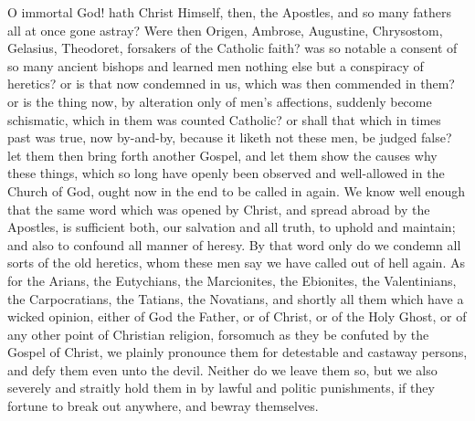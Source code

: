 O immortal God! hath Christ Himself, then, the Apostles, and so many
fathers all at once gone astray? Were then Origen, Ambrose, Augustine,
Chrysostom, Gelasius, Theodoret, forsakers of the Catholic faith? was
so notable a consent of so many ancient bishops and learned men nothing
else but a conspiracy of heretics? or is that now condemned in us, which
was then commended in them? or is the thing now, by alteration only
of men’s affections, suddenly become schismatic, which in them
was counted Catholic? or shall that which in times past was true, now
by-and-by, because it liketh not these men, be judged false? let them
then bring forth another Gospel, and let them show the causes why these
things, which so long have openly been observed and well-allowed in
the Church of God, ought now in the end to be called in again.
We know well enough that the same word which was opened by Christ, and
spread abroad by the Apostles, is sufficient both, our salvation and
all truth, to uphold and maintain; and also to confound all manner of
heresy. By that word only do we condemn all sorts of the old heretics,
whom these men say we have called out of hell again. As for the
Arians, the Eutychians, the Marcionites, the Ebionites, the Valentinians,
the Carpocratians, the Tatians, the Novatians, and shortly all them
which have a wicked opinion, either of God the Father, or of Christ,
or of the Holy Ghost, or of any other point of Christian religion, forsomuch
as they be confuted by the Gospel of Christ, we plainly pronounce them
for detestable and castaway persons, and defy them even unto the devil.
Neither do we leave them so, but we also severely and straitly hold
them in by lawful and politic punishments, if they fortune to break
out anywhere, and bewray themselves.

